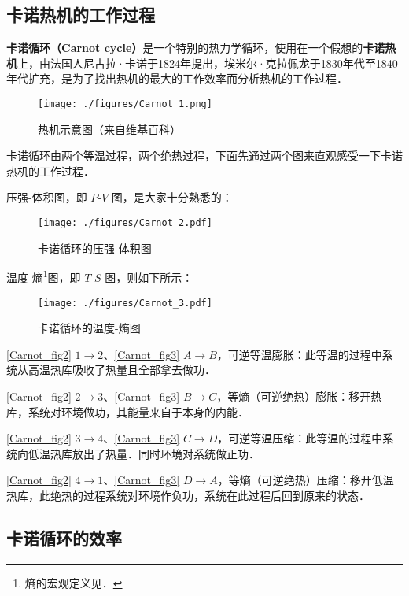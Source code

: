 
\subsection{卡诺热机的工作过程}
\textbf{卡诺循环（Carnot cycle）}是一个特别的热力学循环，使用在一个假想的\textbf{卡诺热机}上，由法国人尼古拉·卡诺于1824年提出，埃米尔·克拉佩龙于1830年代至1840年代扩充，是为了找出热机的最大的工作效率而分析热机的工作过程．

\begin{figure}[ht]
\centering
\texttt{[image: ./figures/Carnot\_1.png]}
\caption{热机示意图（来自维基百科）} \label{Carnot_fig1}
\end{figure}
卡诺循环由两个等温过程，两个绝热过程，下面先通过两个图来直观感受一下卡诺热机的工作过程．

压强-体积图，即 $P$-$V$ 图，是大家十分熟悉的：
\begin{figure}[ht]
\centering
\texttt{[image: ./figures/Carnot\_2.pdf]}
\caption{卡诺循环的压强-体积图} \label{Carnot_fig2}
\end{figure}
温度-熵\footnote{熵的宏观定义见．}图，即 $T$-$S$ 图，则如下所示：
\begin{figure}[ht]
\centering
\texttt{[image: ./figures/Carnot\_3.pdf]}
\caption{卡诺循环的温度-熵图} \label{Carnot_fig3}
\end{figure}

\autoref{Carnot_fig2} $1\to 2$、\autoref{Carnot_fig3} $A\to B$，可逆等温膨胀：此等温的过程中系统从高温热库吸收了热量且全部拿去做功．

\autoref{Carnot_fig2} $2\to 3$、\autoref{Carnot_fig3} $B\to C$，等熵（可逆绝热）膨胀：移开热库，系统对环境做功，其能量来自于本身的内能．

\autoref{Carnot_fig2} $3\to 4$、\autoref{Carnot_fig3} $C\to D$，可逆等温压缩：此等温的过程中系统向低温热库放出了热量．同时环境对系统做正功．

\autoref{Carnot_fig2} $4\to 1$、\autoref{Carnot_fig3} $D\to A$，等熵（可逆绝热）压缩：移开低温热库，此绝热的过程系统对环境作负功，系统在此过程后回到原来的状态．

\subsection{卡诺循环的效率}

